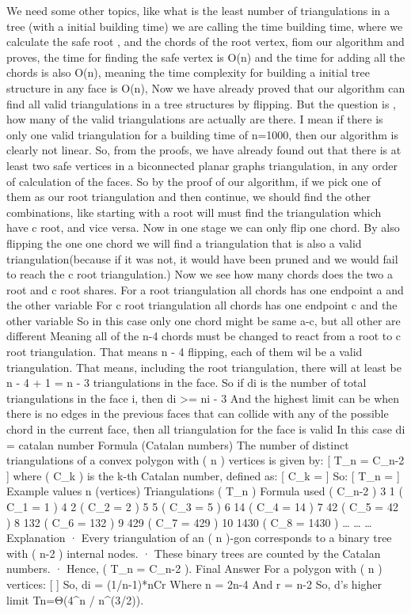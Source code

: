 \documentclass[12pt,a4paper]{article}
\begin{document}
We need some other topics, like what is the least number of triangulations in a tree (with a initial building time)
we are calling the time building time, where we calculate the safe root , and the chords of the root vertex, fiom our algorithm and proves, the time for finding the safe vertex is O(n) and the time for adding all the chords is also O(n), meaning the time complexity for building a initial tree structure in any face is O(n),
Now we have already proved that our algorithm can find all valid triangulations in a tree structures by flipping. But the question is , how many of  the valid triangulations are actually are there. I mean if there is only one valid triangulation for a building time of n=1000, then our algorithm is clearly not linear.
So, from the proofs, we have already found out that there is at least two safe vertices in a biconnected planar graphs triangulation, in any order of calculation of the faces. 
So by the proof of our algorithm, if we pick one of them as our root triangulation and then continue, we should find the other combinations, like starting with a root will must find the triangulation which have c root, and vice versa. 
Now in one stage we can only flip one chord. By also flipping the one one chord we will find a triangulation that is also a valid triangulation(because if it was not, it would have been pruned and we would fail to reach the c root triangulation.)
Now we see how many chords does the two a root and c root shares. 
For a root triangulation all chords has one endpoint a and the other variable
For c root triangulation all chords has one endpoint c and the other variable
So in this case only one chord might be same a-c, but all other are different
Meaning all of the n-4 chords must be changed to react from a root to c root triangulation.
That means n - 4 flipping, each of them wil be a valid triangulation.
That means, including the root triangulation, there will at least be n - 4 + 1 = n - 3 triangulations in the face. 
So if di is the number of total triangulations in the face i, then di >= ni - 3
And the highest limit can be when there is no edges in the previous faces that can collide with any of the possible chord in the current face, then all triangulation for the face is valid
In this case di = catalan number 
 Formula (Catalan numbers)
The number of distinct triangulations of a convex polygon with ( n ) vertices is given by:
[
 T_n = C_{n-2}
 ]
where ( C_k ) is the k-th Catalan number, defined as:
[
 C_k = 
 ]
So:
 [
 T_n = 
 ]
Example values
n (vertices)	Triangulations ( T_n )	Formula used ( C_{n-2} )
3	1	( C_1 = 1 )
4	2	( C_2 = 2 )
5	5	( C_3 = 5 )
6	14	( C_4 = 14 )
7	42	( C_5 = 42 )
8	132	( C_6 = 132 )
9	429	( C_7 = 429 )
10	1430	( C_8 = 1430 )
…	…	…
 Explanation
·	Every triangulation of an ( n )-gon corresponds to a binary tree with ( n-2 ) internal nodes.
·	These binary trees are counted by the Catalan numbers.
·	Hence, ( T_n = C_{n-2} ).
Final Answer
For a polygon with ( n  ) vertices:
 [
 ]
So, di = (1/n-1)*nCr
Where n = 2n-4 
And r = n-2
So, d’s higher limit
Tn​=Θ(4^n / n^(3/2)).
\end{document}
